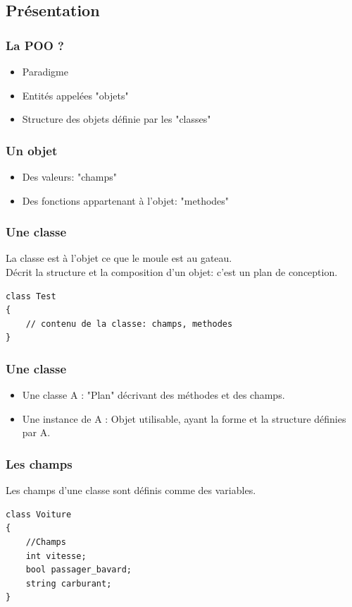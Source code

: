 \documentclass{beamer}
\begin{document}
\subsection{Présentation}

\begin{frame}
\frametitle{La POO ?}
\begin{itemize}
\item Paradigme
\item Entités appelées "objets"
\item Structure des objets définie par les "classes"
\end{itemize}
\end{frame}

\begin{frame}
\frametitle{Un objet}
\begin{itemize}
\item Des valeurs: "champs"
\item Des fonctions appartenant à l'objet: "methodes"
\end{itemize}
\end{frame}

\begin{frame}[fragile]
\frametitle{Une classe}
La classe est à l'objet ce que le moule est au gateau.\\
Décrit la structure et la composition d'un objet: c'est un plan de conception.
\begin{lstlisting}
class Test
{
    // contenu de la classe: champs, methodes
}
\end{lstlisting}
\end{frame}

\begin{frame}
\frametitle{Une classe}
\begin{itemize}
\item Une classe A : "Plan" décrivant des méthodes et des champs.
\item Une instance de A : Objet utilisable, ayant la forme et la structure définies par A.
\end{itemize}
\end{frame}

\begin{frame}[fragile]
\frametitle{Les champs}
Les champs d'une classe sont définis comme des variables.
\begin{lstlisting}
class Voiture
{
    //Champs
    int vitesse;
    bool passager_bavard;
    string carburant;
}
\end{lstlisting}
\end{frame}
\end{document}
